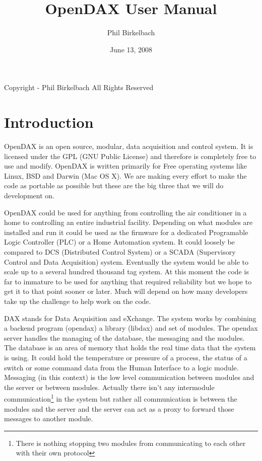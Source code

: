 \documentclass[letterpaper,10pt]{report}
\title{OpenDAX User Manual}
\date{June 13, 2008}
\author{Phil Birkelbach}
\begin{document}
\begin{titlepage}
\maketitle

\begin{flushleft}
Copyright  - Phil Birkelbach\linebreak
All Rights Reserved
\end{flushleft}

\end{titlepage}
\chapter*{Introduction}
OpenDAX is an open source, modular, data acquisition and control system. It is licensed under the GPL (GNU Public License) and therefore is completely free to use and modify. OpenDAX is written primarily for Free operating systems like Linux, BSD and Darwin (Mac OS X). We are making every effort to make the code as portable as possible but these are the big three that we will do development on.

OpenDAX could be used for anything from controlling the air conditioner in a home to controlling an entire industrial facility. Depending on what modules are installed and run it could be used as the firmware for a dedicated Programable Logic Controller (PLC) or a Home Automation system. It could loosely be compared to DCS (Distributed Control System) or a SCADA (Supervisory Control and Data Acquisition) system. Eventually the system would be able to scale up to a several hundred thousand tag system. At this moment the code is far to immature to be used for anything that required reliability but we hope to get it to that point sooner or later. Much will depend on how many developers take up the challenge to help work on the code.

DAX stands for Data Acquisition and eXchange. The system works by combining a backend program (opendax) a library (libdax) and set of modules. The opendax server handles the managing of the database, the messaging and the modules.  The database is an area of memory that holds the real time data that the system is using.  It could hold the temperature or pressure of a process, the status of a switch or some command data from the Human Interface to a logic module.  Messaging (in this context) is the low level communication between modules and the server or between modules.  Actually there isn't any intermodule communication\footnote{There is nothing stopping two modules from communicating to each other with their own protocol} in the system but rather all communication is between the modules and the server and the server can act as a proxy to forward those messages to another module.
\end{document}
